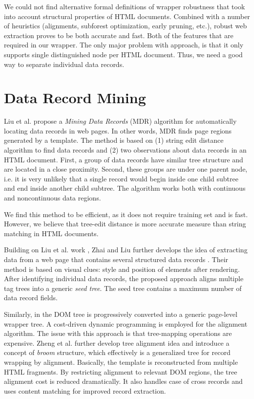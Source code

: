 We could not find alternative formal definitions of wrapper robustness that took into account structural properties of HTML documents. Combined with a number of heuristics (alignments, subforest optimization, early pruning, etc.), robust web extraction proves to be both accurate and fast. Both of the features that are required in our wrapper. The only major problem with approach, is that it only supports single distinguished node per HTML document. Thus, we need a good way to separate individual data records.


\section{Data Record Mining}
\label{sec:data-record-mining}

Liu et al. \cite{liu2009a} propose a \emph{Mining Data Records} (MDR) algorithm for automatically locating data records in web pages. In other words, MDR finds page regions generated by a template. The method is based on (1) string edit distance algorithm to find data records and (2) two observations about data records in an HTML document. First, a group of data records have similar tree structure and are located in a close proximity. Second, these groups are under one parent node, i.e. it is very unlikely that a single record would begin inside one child subtree and end inside another child subtree. The algorithm works both with continuous and noncontinuous data regions. 

We find this method to be efficient, as it does not require training set and is fast. However, we believe that tree-edit distance is more accurate measure than string matching in HTML documents.

Building on Liu et al. work \cite{liu2009a}, Zhai and Liu further develops the idea of extracting data from a web page that contains several structured data records \cite{zhai2005a}. Their method is based on visual clues: style and position of elements after rendering. After identifying individual data records, the proposed approach aligns multiple tag trees into a generic \emph{seed tree}. The seed tree contains a maximum number of data record fields.

Similarly, in \cite{zheng2007a} the DOM tree is progressively converted into a generic page-level wrapper tree. A cost-driven dynamic programming is employed for the alignment algorithm. The issue with this approach is that tree-mapping operations are expensive. Zheng et al. further develop tree alignment idea \cite{DBLP:conf/cikm/ZhengSWG09} and introduce a concept of \emph{broom} structure, which effectively is a generalized tree for record wrapping by alignment. Basically, the template is reconstructed from multiple HTML fragments. By restricting alignment to relevant DOM regions, the tree alignment cost is reduced dramatically. It also handles case of cross records and uses content matching for improved record extraction.

